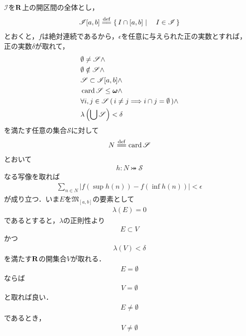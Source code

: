 	\begin{sketch}
		$\mathscr{I}$を$\mathbf{R}$上の開区間の全体とし，
		\begin{align}
			\mathscr{I}[a,b] \defeq \Set{I \cap [a,b]}{I \in \mathscr{I}}
		\end{align}
		とおくと，$f$は絶対連続であるから，$\epsilon$を任意に与えられた正の実数とすれば，
		正の実数$\delta$が取れて，
		\begin{align}
			&\emptyset \neq \mathscr{S} \wedge \\
			&\emptyset \notin \mathscr{S} \wedge \\
			&\mathscr{S} \subset \mathscr{I}[a,b] \wedge \\
			&\operatorname{card} \mathscr{S} \leq {\boldsymbol \omega} \wedge \\
			&\forall i,j \in \mathscr{S}\, (\, i \neq j \Longrightarrow i \cap j = \emptyset\, ) \wedge \\
			&\lambda\left(\bigcup \mathscr{S}\right) < \delta
		\end{align}
		を満たす任意の集合$\mathscr{S}$に対して
		\begin{align}
			N \defeq \card{\mathscr{S}}
		\end{align}
		とおいて
		\begin{align}
			h:N \bij \mathscr{S}
		\end{align}
		なる写像を取れば
		\begin{align}
			\sum_{n \in N} |f(\sup{}{h(n)}) - f(\inf{}{h(n)})| < \epsilon
		\end{align}
		が成り立つ．いま$E$を$\mathfrak{M}_{[a,b]}$の要素として
		\begin{align}
			\lambda(E) = 0
		\end{align}
		であるとすると，$\lambda$の正則性より
		\begin{align}
			E \subset V
		\end{align}
		かつ
		\begin{align}
			\lambda(V) < \delta
		\end{align}
		を満たす$\mathbf{R}$の開集合$V$が取れる．
		\begin{align}
			E = \emptyset
		\end{align}
		ならば
		\begin{align}
			V = \emptyset
		\end{align}
		と取れば良い．
		\begin{align}
			E \neq \emptyset
		\end{align}
		であるとき，
		\begin{align}
			V \neq \emptyset
		\end{align}

\end{sketch}
